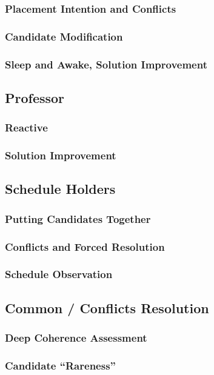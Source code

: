 \documentclass{beamer}
\begin{document}
\subsubsection{Placement Intention and Conflicts}
\subsubsection{Candidate Modification}
\subsubsection{Sleep and Awake, Solution Improvement}

\subsection{Professor}
\subsubsection{Reactive}
\subsubsection{Solution Improvement}

\subsection{Schedule Holders}
\subsubsection{Putting Candidates Together}
\subsubsection{Conflicts and Forced Resolution}
\subsubsection{Schedule Observation}

\subsection{Common / Conflicts Resolution}
\subsubsection{Deep Coherence Assessment}
\subsubsection{Candidate ``Rareness''}
\end{document}
